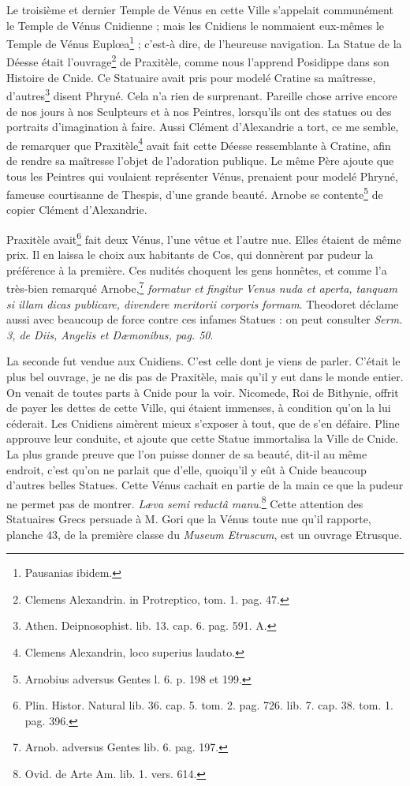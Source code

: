 \documentclass[a4paper, 18pt, oneside]{article}
\begin{document}
Le troisième et dernier Temple de Vénus en cette Ville s'appelait communément le Temple de Vénus Cnidienne ; mais les Cnidiens le nommaient eux-mêmes le Temple de Vénus Euplœa\footnote{Pausanias ibidem.} ; c'est-à dire, de l'heureuse navigation. La Statue de la Déesse était l'ouvrage\footnote{Clemens Alexandrin. in Protreptico, tom. 1. pag. 47.} de Praxitèle, comme nous l'apprend Posidippe dans son Histoire de Cnide. Ce Statuaire avait pris pour modelé Cratine sa maîtresse, d'autres\footnote{Athen. Deipnosophist. lib. 13. cap. 6. pag. 591. A.} disent Phryné. Cela n'a rien de surprenant. Pareille chose arrive encore de nos jours à nos Sculpteurs et à nos Peintres, lorsqu'ils ont des statues ou des portraits d'imagination à faire. Aussi Clément d'Alexandrie a tort, ce me semble, de remarquer que Praxitèle\footnote{Clemens Alexandrin, loco superius laudato.} avait fait cette Déesse ressemblante à Cratine, afin de rendre sa maîtresse l'objet de l'adoration publique. Le même Père ajoute que tous les Peintres qui voulaient représenter Vénus, prenaient pour modelé Phryné, fameuse courtisanne de Thespis, d'une grande beauté. Arnobe se contente\footnote{Arnobius adversus Gentes l. 6. p. 198 et 199.} de copier Clément d'Alexandrie.

Praxitèle avait\footnote{Plin. Histor. Natural lib. 36. cap. 5. tom. 2. pag. 726. lib. 7. cap. 38. tom. 1. pag. 396.} fait deux Vénus, l'une vêtue et l'autre nue. Elles étaient de même prix. Il en laissa le choix aux habitants de Cos, qui donnèrent par pudeur la préférence à la première. Ces nudités choquent les gens honnêtes, et comme l'a très-bien remarqué Arnobe,\footnote{Arnob. adversus Gentes lib. 6. pag. 197.} \emph{formatur et fingitur Venus nuda et aperta, tanquam si illam dicas publicare, divendere meritorii corporis formam}. Theodoret déclame aussi avec beaucoup de force contre ces infames Statues : on peut consulter \emph{Serm. 3, de Diis, Angelis et Dæmonibus, pag. 50}.

La seconde fut vendue aux Cnidiens. C'est celle dont je viens de parler. C'était le plus bel ouvrage, je ne dis pas de Praxitèle, mais qu'il y eut dans le monde entier. On venait de toutes parts à Cnide pour la voir. Nicomede, Roi de Bithynie, offrit de payer les dettes de cette Ville, qui étaient immenses, à condition qu'on la lui céderait. Les Cnidiens aimèrent mieux s'exposer à tout, que de s'en défaire. Pline approuve leur conduite, et ajoute que cette Statue immortalisa la Ville de Cnide. La plus grande preuve que l'on puisse donner de sa beauté, dit-il au même endroit, c'est qu'on ne parlait que d'elle, quoiqu'il y eût à Cnide beaucoup d'autres belles Statues. Cette Vénus cachait en partie de la main ce que la pudeur ne permet pas de montrer. \emph{Læva semi reductâ manu}.\footnote{Ovid. de Arte Am. lib. 1. vers. 614.} Cette attention des Statuaires Grecs persuade à M. Gori que la Vénus toute nue qu'il rapporte, planche 43, de la première classe du \emph{Museum Etruscum}, est un ouvrage Etrusque.
\end{document}
